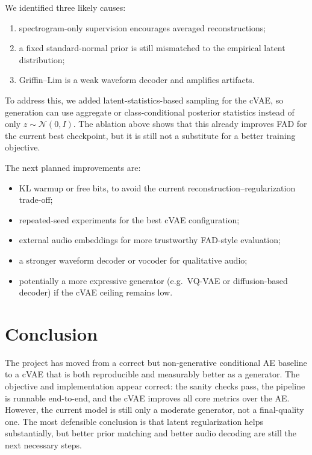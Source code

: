 \documentclass[10pt]{article}
\begin{document}
We identified three likely causes:
\begin{enumerate}
\item spectrogram-only supervision encourages averaged reconstructions;
\item a fixed standard-normal prior is still mismatched to the empirical latent distribution;
\item Griffin--Lim is a weak waveform decoder and amplifies artifacts.
\end{enumerate}

To address this, we added latent-statistics-based sampling for the cVAE, so generation can use aggregate or class-conditional posterior statistics instead of only \(z \sim \mathcal{N}(0, I)\).
The ablation above shows that this already improves FAD for the current best checkpoint, but it is still not a substitute for a better training objective.

The next planned improvements are:
\begin{itemize}
\item KL warmup or free bits, to avoid the current reconstruction--regularization trade-off;
\item repeated-seed experiments for the best cVAE configuration;
\item external audio embeddings for more trustworthy FAD-style evaluation;
\item a stronger waveform decoder or vocoder for qualitative audio;
\item potentially a more expressive generator (e.g.\ VQ-VAE or diffusion-based decoder) if the cVAE ceiling remains low.
\end{itemize}

\section*{Conclusion}
The project has moved from a correct but non-generative conditional AE baseline to a cVAE that is both reproducible and measurably better as a generator.
The objective and implementation appear correct: the sanity checks pass, the pipeline is runnable end-to-end, and the cVAE improves all core metrics over the AE.
However, the current model is still only a moderate generator, not a final-quality one.
The most defensible conclusion is that latent regularization helps substantially, but better prior matching and better audio decoding are still the next necessary steps.
\end{document}
